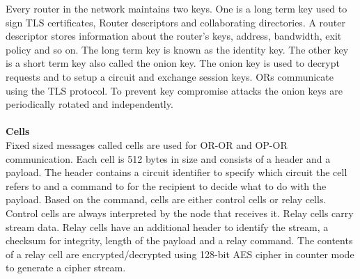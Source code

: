 \documentclass{llncs}
\begin{document}
Every router in the network maintains two keys. One is a long term key used to sign TLS certificates, Router descriptors and collaborating directories. A router descriptor stores information about the router's keys, address, bandwidth, exit policy and so on. The long term key is known as the identity key. The other key is a short term key also called the onion key. The onion key is used to decrypt requests and to setup a circuit and exchange session keys. ORs communicate using the TLS protocol. To prevent key compromise attacks the onion keys are periodically rotated and independently.
\\ \\
\textbf{Cells}
\\
Fixed sized messages called cells are used for OR-OR and OP-OR communication. Each cell is 512 bytes in size and consists of a header and a payload. The header contains a circuit identifier to specify which circuit the cell refers to and a command to for the recipient to decide what to do with the payload.
Based on the command, cells are either control cells or relay cells. Control cells are always interpreted by the node that receives it. Relay cells carry stream data. Relay cells have an additional header to identify the stream, a checksum for integrity, length of the payload and a relay command. The contents of a relay cell are encrypted/decrypted using 128-bit AES cipher in counter mode to generate a cipher stream.

\end{document}
